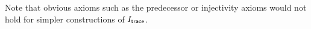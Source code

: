 Note that obvious axioms such as the predecessor or injectivity axioms
would not hold for simpler constructions of $I_{\textsf{trace}}$.
%
%
%
%
